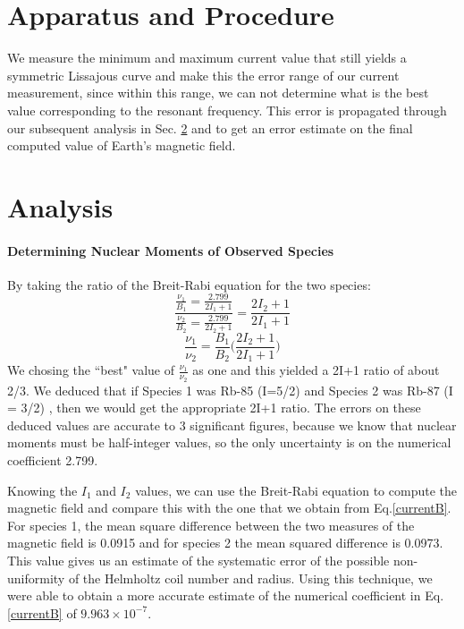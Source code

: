 \documentclass[iop,revtex4]{emulateapj_mod}
\begin{document}
\section{Apparatus and Procedure}\label{sec:ap}
We measure the minimum and maximum current value that still yields a symmetric Lissajous curve and make this the error range of our current measurement, since within this range, we can not determine what is the best value corresponding to the resonant frequency. This error is propagated through our subsequent analysis in Sec. \ref{sec:analysis} and to get an error estimate on the final computed value of Earth's magnetic field.
\section{Analysis}\label{sec:analysis}
\paragraph{Determining Nuclear Moments of Observed Species}
\par By taking the ratio of the Breit-Rabi equation for the two species: 
\begin{equation*}
\frac{\frac{\nu_1}{B_1} = \frac{2.799}{2I_1+1}}{\frac{\nu_2}{B_2} = \frac{2.799}{2I_2+1}} = \frac{2I_2+1}{2I_1+1}
\end{equation*}
\begin{equation*}
\frac{\nu_1}{\nu_2} = \frac{B_1}{B_2}\Bigg(\frac{2I_2+1}{2I_1+1}\Bigg)
\end{equation*}
We chosing the ``best" value of $\frac{\nu_1}{\nu_2} $ as one and this yielded a 2I+1 ratio of about 2/3. We deduced that if Species 1 was Rb-85 (I=5/2) and Species 2 was Rb-87 (I = 3/2) \citep{PhysRev}, then we would get the appropriate 2I+1 ratio. The errors on these deduced values are accurate to 3 significant figures, because we know that nuclear moments must be half-integer values, so the only uncertainty is on the numerical coefficient 2.799. 
\par Knowing the $I_1$ and $I_2$ values, we can use the Breit-Rabi equation to compute the magnetic field and compare this with the one that we obtain from Eq.\ref{currentB}. For species 1, the mean square difference between the two measures of the magnetic field is 0.0915 and for species 2 the mean squared difference is 0.0973. This value gives us an estimate of the systematic error of the possible non-uniformity of the Helmholtz coil number and radius.  Using this technique, we were able to obtain a more accurate estimate of the numerical coefficient in Eq.\ref{currentB} of  $9.963\times 10^{-7}$. 
\end{document}
